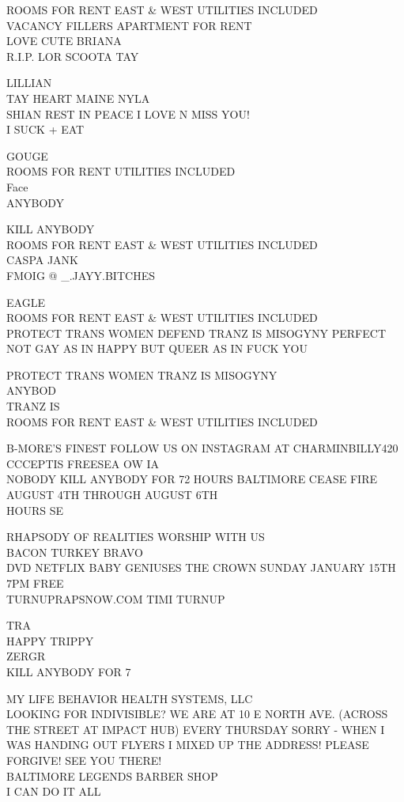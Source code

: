 \documentclass[10pt,letterpaper]{article}
\begin{document}
ROOMS FOR RENT EAST \& WEST UTILITIES INCLUDED\\
VACANCY FILLERS APARTMENT FOR RENT\\
LOVE CUTE BRIANA\\
R.I.P. LOR SCOOTA TAY

LILLIAN\\
TAY HEART MAINE NYLA\\
SHIAN REST IN PEACE I LOVE N MISS YOU!\\
I SUCK + EAT

GOUGE\\
ROOMS FOR RENT UTILITIES INCLUDED\\
Face\\
ANYBODY

KILL ANYBODY\\
ROOMS FOR RENT EAST \& WEST UTILITIES INCLUDED\\
CASPA JANK\\
FMOIG @ \_.JAYY.BITCHES

EAGLE\\
ROOMS FOR RENT EAST \& WEST UTILITIES INCLUDED\\
PROTECT TRANS WOMEN DEFEND TRANZ IS MISOGYNY PERFECT\\
NOT GAY AS IN HAPPY BUT QUEER AS IN FUCK YOU

PROTECT TRANS WOMEN TRANZ IS MISOGYNY\\
ANYBOD\\
TRANZ IS\\
ROOMS FOR RENT EAST \& WEST UTILITIES INCLUDED

B{-}MORE'S FINEST FOLLOW US ON INSTAGRAM AT CHARMINBILLY420\\
CCCEPTIS FREESEA OW IA\\
NOBODY KILL ANYBODY FOR 72 HOURS BALTIMORE CEASE FIRE AUGUST 4TH THROUGH AUGUST 6TH\\
HOURS SE

RHAPSODY OF REALITIES WORSHIP WITH US\\
BACON TURKEY BRAVO\\
DVD NETFLIX BABY GENIUSES THE CROWN SUNDAY JANUARY 15TH 7PM FREE\\
TURNUPRAPSNOW.COM TIMI TURNUP

TRA\\
HAPPY TRIPPY\\
ZERGR\\
KILL ANYBODY FOR 7

MY LIFE BEHAVIOR HEALTH SYSTEMS, LLC\\
LOOKING FOR INDIVISIBLE?  WE ARE AT 10 E NORTH AVE. (ACROSS THE STREET AT IMPACT HUB) EVERY THURSDAY SORRY  {-} WHEN I WAS HANDING OUT FLYERS I MIXED UP THE ADDRESS!  PLEASE FORGIVE!  SEE YOU THERE!\\
BALTIMORE LEGENDS BARBER SHOP\\
I CAN DO IT ALL
\end{document}
